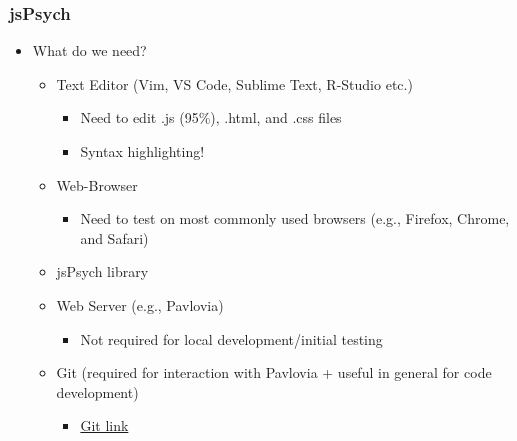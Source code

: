 \documentclass[t]{beamer}
\begin{document}
\begin{frame}[fragile]
    \frametitle{jsPsych}
    \begin{itemize}
        \item What do we need?
            \begin{itemize}
                \item Text Editor (Vim, VS Code, Sublime Text, R-Studio etc.)
                    \begin{itemize}
                        \item Need to edit .js (95\%), .html, and .css files
                        \item Syntax highlighting!
                    \end{itemize}
                \item Web-Browser  
                    \begin{itemize}
                        \item Need to test on most commonly used browsers (e.g., Firefox, Chrome, and Safari)
                    \end{itemize}
                \item jsPsych library
                \item Web Server (e.g., Pavlovia)
                    \begin{itemize}
                        \item Not required for local development/initial testing
                    \end{itemize}
                \item Git (required for interaction with Pavlovia + useful in general for code development) 
                    \begin{itemize}
                        \item \href{https://git-scm.com/}{Git link}
                    \end{itemize}
            \end{itemize}
    \end{itemize}
\end{frame}
\end{document}
